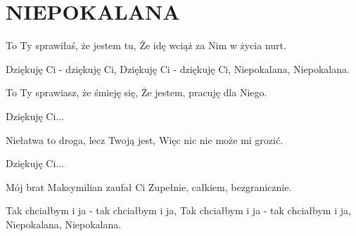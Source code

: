 \documentclass[../../../songbook.tex]{subfiles}
\begin{document}
\TabPositions{8cm} %
\section*{NIEPOKALANA}
{}
\vspace{0.5cm}
To Ty sprawiłaś, że jestem tu,		 \newline
Że idę wciąż za Nim w życia nurt.	  \newline

\-\hspace{1cm} Dziękuję Ci - dziękuję Ci,	 \newline
\-\hspace{1cm} Dziękuję Ci - dziękuję Ci,	 \newline
\-\hspace{1cm} Niepokalana, Niepokalana.	 \newline

To Ty sprawiasz, że śmieję się, \newline
Że jestem, pracuję dla Niego. \newline

\-\hspace{1cm} Dziękuję Ci... \newline

Niełatwa to droga, lecz Twoją jest, \newline
Więc nic nie może mi grozić. \newline

\-\hspace{1cm} Dziękuję Ci... \newline

Mój brat Maksymilian zaufał Ci \newline
Zupełnie, całkiem, bezgranicznie. \newline

\-\hspace{1cm} Tak chciałbym i ja - tak chciałbym i ja, \newline
\-\hspace{1cm} Tak chciałbym i ja - tak chciałbym i ja, \newline
\-\hspace{1cm} Niepokalana, Niepokalana. \newline
\end{document}

